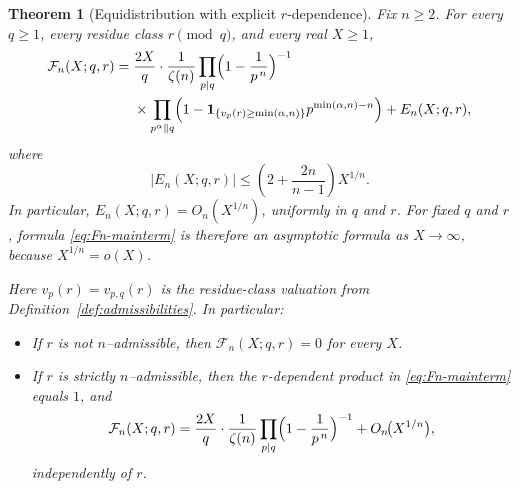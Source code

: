 \documentclass[12pt,a4paper,oneside]{amsart}
\newtheorem{theorem}{Theorem}[section]
\theoremstyle{definition}
\begin{document}
\begin{theorem}[Equidistribution with explicit $r$-dependence]\label{thm:equidistribution}
Fix $n\ge2$. For every $q\ge1$, every residue class $r\pmod q$, and every real $X\ge1$,
\begin{equation}\label{eq:Fn-mainterm}
\begin{aligned}
\mathcal F_n(X;q,r)
={}&
\frac{2X}{q}\cdot\frac{1}{\zeta(n)}
\prod_{p\mid q}\Bigl(1-\frac1{p^{\,n}}\Bigr)^{-1}\\
&\times
\prod_{p^\alpha\parallel q}
\Bigl(1-\mathbf 1_{\{v_p(r)\ge \min(\alpha,n)\}}
      p^{\min(\alpha,n)-n}\Bigr)
+E_n(X;q,r),
\end{aligned}
\end{equation}
where
\begin{equation}\label{eq:Fn-error-explicit}
\bigl|E_n(X;q,r)\bigr|
\le
\left(2+\frac{2n}{n-1}\right)X^{1/n}.
\end{equation}
In particular, $E_n(X;q,r)=O_n(X^{1/n})$, uniformly in $q$ and $r$.
For fixed $q$ and $r$, formula \eqref{eq:Fn-mainterm} is therefore an asymptotic formula as
$X\to\infty$, because $X^{1/n}=o(X)$.

Here $v_p(r)=v_{p,q}(r)$ is the residue-class valuation from Definition~\ref{def:admissibilities}.
In particular:
\begin{itemize}
\item If $r$ is \emph{not} $n$--admissible, then $\mathcal F_n(X;q,r)=0$ for every $X$.
\item If $r$ is \emph{strictly $n$--admissible}, then the $r$-dependent product in
\eqref{eq:Fn-mainterm} equals $1$, and
\[
\mathcal F_n(X;q,r)=
\frac{2X}{q}\cdot\frac{1}{\zeta(n)}
\prod_{p\mid q}\Bigl(1-\frac1{p^{\,n}}\Bigr)^{-1}
+O_n\!\bigl(X^{1/n}\bigr),
\]
independently of $r$.
\end{itemize}
\end{theorem}
\end{document}
